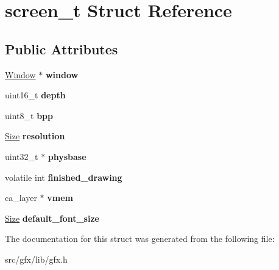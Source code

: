 \hypertarget{structscreen__t}{}\section{screen\+\_\+t Struct Reference}
\label{structscreen__t}
\subsection*{Public Attributes}
\begin{DoxyCompactItemize}
\item 
\mbox{\label{structscreen__t_a228deef0c877ddb780861acf0369834c}} 
\hyperlink{structwindow}{Window} $\ast$ {\bfseries window}
\item 
\mbox{\label{structscreen__t_a46dbb91e6d523821d2d0004aefd6ecee}} 
uint16\+\_\+t {\bfseries depth}
\item 
\mbox{\label{structscreen__t_a72012e31e5f983a87dd38484c75cfaff}} 
uint8\+\_\+t {\bfseries bpp}
\item 
\mbox{\label{structscreen__t_a4acd748f5fe0cb47c7f04e8c92c73844}} 
\hyperlink{structsize}{Size} {\bfseries resolution}
\item 
\mbox{\label{structscreen__t_a04adc9010b161e8b905ddb9ea0795692}} 
uint32\+\_\+t $\ast$ {\bfseries physbase}
\item 
\mbox{\label{structscreen__t_acb02e8a6ba15aa9a424ece88d306127a}} 
volatile int {\bfseries finished\+\_\+drawing}
\item 
\mbox{\label{structscreen__t_a2f0933b76e08c64756d71918f70dc6b9}} 
ca\+\_\+layer $\ast$ {\bfseries vmem}
\item 
\mbox{\label{structscreen__t_a0baec0684a085ca63ee5915f017dffa4}} 
\hyperlink{structsize}{Size} {\bfseries default\+\_\+font\+\_\+size}
\end{DoxyCompactItemize}


The documentation for this struct was generated from the following file\+:\begin{DoxyCompactItemize}
\item 
src/gfx/lib/gfx.\+h\end{DoxyCompactItemize}
